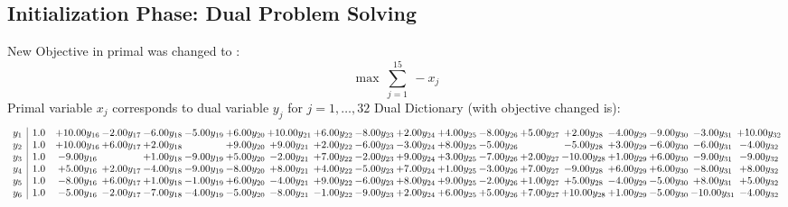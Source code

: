 \documentclass[9pt]{article}
\begin{document}
\subsection{Initialization Phase: Dual Problem Solving}
New Objective in primal was changed to : \[ \max\ \sum_{j=1}^{15}\ - x_j \] 
Primal variable $x_j$ corresponds to dual variable $y_j$ for $j = 1,\ldots,32$
Dual Dictionary (with objective changed is): 
\[\begin{array}{c| c c@{\hskip 2pt} c@{\hskip 2pt} c@{\hskip 2pt} c@{\hskip 2pt} c@{\hskip 2pt} c@{\hskip 2pt} c@{\hskip 2pt} c@{\hskip 2pt} c@{\hskip 2pt} c@{\hskip 2pt} c@{\hskip 2pt} c@{\hskip 2pt} c@{\hskip 2pt} c@{\hskip 2pt} c@{\hskip 2pt} c@{\hskip 2pt} c@{\hskip 2pt} }
 y_{1}   &  1.0 & + 10.00 y_{16} & -2.00 y_{17} & -6.00 y_{18} & -5.00 y_{19} & +  6.00 y_{20} & + 10.00 y_{21} & +  6.00 y_{22} & -8.00 y_{23} & +  2.00 y_{24} & +  4.00 y_{25} & -8.00 y_{26} & +  5.00 y_{27} & +  2.00 y_{28} & -4.00 y_{29} & -9.00 y_{30} & -3.00 y_{31} & + 10.00 y_{32}\\
 y_{2}   &  1.0 & + 10.00 y_{16} & +  6.00 y_{17} & +  2.00 y_{18} &   & +  9.00 y_{20} & +  9.00 y_{21} & +  2.00 y_{22} & -6.00 y_{23} & -3.00 y_{24} & +  8.00 y_{25} & -5.00 y_{26} &   & -5.00 y_{28} & +  3.00 y_{29} & -6.00 y_{30} & -6.00 y_{31} & -4.00 y_{32}\\
 y_{3}   &  1.0 & -9.00 y_{16} &   & +  1.00 y_{18} & -9.00 y_{19} & +  5.00 y_{20} & -2.00 y_{21} & +  7.00 y_{22} & -2.00 y_{23} & +  9.00 y_{24} & +  3.00 y_{25} & -7.00 y_{26} & +  2.00 y_{27} & -10.00 y_{28} & +  1.00 y_{29} & +  6.00 y_{30} & -9.00 y_{31} & -9.00 y_{32}\\
 y_{4}   &  1.0 & +  5.00 y_{16} & +  2.00 y_{17} & -4.00 y_{18} & -9.00 y_{19} & -8.00 y_{20} & +  8.00 y_{21} & +  4.00 y_{22} & -5.00 y_{23} & +  7.00 y_{24} & +  1.00 y_{25} & -3.00 y_{26} & +  7.00 y_{27} & -9.00 y_{28} & +  6.00 y_{29} & +  6.00 y_{30} & -8.00 y_{31} & +  8.00 y_{32}\\
 y_{5}   &  1.0 & -8.00 y_{16} & +  6.00 y_{17} & +  1.00 y_{18} & -1.00 y_{19} & +  6.00 y_{20} & -4.00 y_{21} & +  9.00 y_{22} & -6.00 y_{23} & +  8.00 y_{24} & +  9.00 y_{25} & -2.00 y_{26} & +  1.00 y_{27} & +  5.00 y_{28} & -4.00 y_{29} & -5.00 y_{30} & +  8.00 y_{31} & +  5.00 y_{32}\\
 y_{6}   &  1.0 & -5.00 y_{16} & -2.00 y_{17} & -7.00 y_{18} & -4.00 y_{19} & -5.00 y_{20} & -8.00 y_{21} & -1.00 y_{22} & -9.00 y_{23} & +  2.00 y_{24} & +  6.00 y_{25} & +  5.00 y_{26} & +  7.00 y_{27} & + 10.00 y_{28} & +  1.00 y_{29} & -5.00 y_{30} & -10.00 y_{31} & -4.00 y_{32}\\

\end{array}\]
\end{document}
